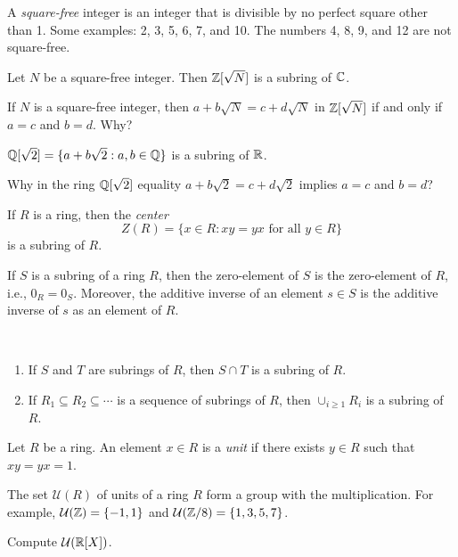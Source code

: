 A \emph{square-free} integer is an integer that is divisible by 
no perfect square other than 1. Some examples: 2, 3, 5, 6, 7, and 10. 
The numbers 4, 8, 9, and 12 are not square-free. 

\begin{example}
	Let $N$ be a square-free integer. Then $\mathbb{Z}[\sqrt{N}]$ is
	a subring of $\mathbb{C}$.  	
\end{example}

If $N$ is a square-free integer, then 
$a+b\sqrt{N}=c+d\sqrt{N}$ in $\mathbb{Z}[\sqrt{N}]$ 
if and only if $a=c$ and $b=d$. Why?

\begin{example}
    $\mathbb{Q}[\sqrt{2}]=\{a+b\sqrt{2}:a,b\in\mathbb{Q}\}$ is a subring of $\mathbb{R}$. 
\end{example}

Why in the ring $\mathbb{Q}[\sqrt{2}]$ 
equality $a+b\sqrt{2}=c+d\sqrt{2}$ implies $a=c$ and $b=d$?

\begin{example}
    If $R$ is a ring, then the \emph{center} 
    \[
    Z(R)=\{x\in R:xy=yx\text{ for all $y\in R$}\}
    \]
    is a subring of $R$. 
\end{example}

If $S$ is a subring of a ring $R$, then the zero-element 
of $S$ is the zero-element of $R$, i.e., $0_R=0_S$. Moreover, 
the additive inverse of an element $s\in S$ 
is the additive inverse of $s$ as an element of $R$. 	

\begin{exercise}\
\begin{enumerate}
	\item If $S$ and $T$ are subrings of $R$, then $S\cap T$ is a subring of $R$.
	\item If $R_1\subseteq R_2\subseteq\cdots$ is a sequence of subrings of $R$, then 
	$\cup_{i\geq1}R_i$ is a subring of $R$. 
\end{enumerate}
\end{exercise}

\begin{definition}
	Let $R$ be a ring. An element $x\in R$ is 
	a \emph{unit} if there exists $y\in R$ such that $xy=yx=1$. 
\end{definition}

The set $\mathcal{U}(R)$ of units of a ring $R$ form 
a group with the multiplication. For example, $\mathcal{U}(\mathbb{Z})=\{-1,1\}$ and 
$\mathcal{U}(\mathbb{Z}/8)=\{1,3,5,7\}$. 

\begin{exercise}
\label{xca:units_R[X]}
Compute $\mathcal{U}(\mathbb{R}[X])$.
\end{exercise}

